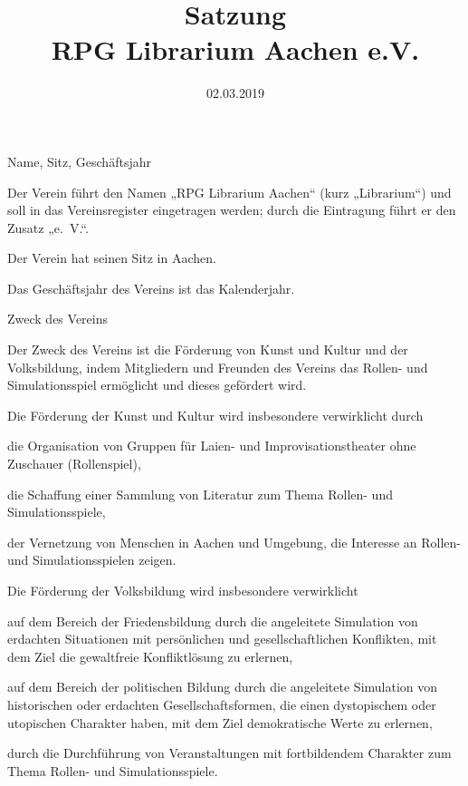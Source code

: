\documentclass[11pt,a4paper,twoside,openany,article]{memoir}
\title{ Satzung \\ RPG Librarium Aachen e.V.}
\date{02.03.2019}
\begin{document}
	\maketitle
	\sloppy
\begin{para}{Name, Sitz, Geschäftsjahr}
	\label{p:name}
	\item Der Verein führt den Namen „RPG Librarium Aachen“ (kurz „Librarium“) und soll in das Vereinsregister eingetragen werden; durch die Eintragung führt er den Zusatz „e.~V.“.
	\item Der Verein hat seinen Sitz in Aachen.
	\item Das Geschäftsjahr des Vereins ist das Kalenderjahr.
\end{para}

\begin{para}{Zweck des Vereins}
	\label{p:zweck}
	\item Der Zweck des Vereins ist die Förderung von Kunst und Kultur und der Volksbildung, indem Mitgliedern und Freunden des Vereins das Rollen- und Simulationsspiel ermöglicht und dieses gefördert wird.
	\item Die Förderung der Kunst und Kultur wird insbesondere verwirklicht durch
	\begin{subpara}
		\item die Organisation von Gruppen für Laien- und Improvisationstheater ohne Zuschauer (Rollenspiel),
		\item die Schaffung einer Sammlung von Literatur zum Thema Rollen- und Simulationsspiele,
		\item der Vernetzung von Menschen in Aachen und Umgebung, die Interesse an Rollen- und Simulationsspielen zeigen.
	\end{subpara}
	\item Die Förderung der Volksbildung wird insbesondere verwirklicht
	\begin{subpara}
		\item auf dem Bereich der Friedensbildung durch die angeleitete Simulation von erdachten Situationen mit persönlichen und gesellschaftlichen Konflikten, mit dem Ziel die gewaltfreie Konfliktlösung zu erlernen,
		\item auf dem Bereich der politischen Bildung durch die angeleitete Simulation von historischen oder erdachten Gesellschaftsformen, die einen dystopischem oder utopischen Charakter haben, mit dem Ziel demokratische Werte zu erlernen,
		\item durch die Durchführung von Veranstaltungen mit fortbildendem Charakter zum Thema Rollen- und Simulationsspiele.
	\end{subpara}
\end{para}
\end{document}
